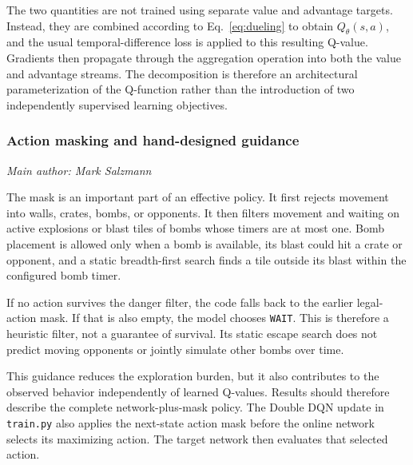 \documentclass[11pt,a4paper]{article}
\newcommand{\contributionauthor}[1]{{\small\textit{Main author: #1}\par}}
\begin{document}
The two quantities are not trained using separate value and advantage targets. Instead, they are combined according to Eq.~\eqref{eq:dueling} to obtain \(Q_\theta(s,a)\), and the usual temporal-difference loss is applied to this resulting Q-value. Gradients then propagate through the aggregation operation into both the value and advantage streams. The decomposition is therefore an architectural parameterization of the Q-function rather than the introduction of two independently supervised learning objectives.


\FloatBarrier

\subsubsection{Action masking and hand-designed guidance}
\contributionauthor{Mark Salzmann}
The mask is an important part of an effective policy. It first rejects
movement into walls, crates, bombs, or opponents. It then filters movement
and waiting on active explosions or blast tiles of bombs whose timers are
at most one. Bomb placement is allowed only when a bomb is available, its
blast could hit a crate or opponent, and a static breadth-first search finds
a tile outside its blast within the configured bomb timer.

If no action survives the danger filter, the code falls back to the earlier
legal-action mask. If that is also empty, the model chooses \texttt{WAIT}.
This is therefore a heuristic filter, not a guarantee of survival. 
Its static escape search does not predict moving opponents or jointly simulate other bombs over time.

This guidance reduces the exploration burden, but it also contributes to
the observed behavior independently of learned Q-values. Results should
therefore describe the complete network-plus-mask policy. The Double DQN
update in \texttt{train.py} also applies the next-state
action mask before the online network selects its maximizing action. The
target network then evaluates that selected action.
\end{document}
